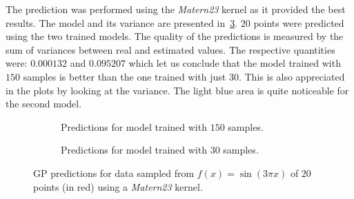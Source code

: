 The prediction was performed using the \emph{Matern23} kernel as it provided the
best results. The model and its variance are presented
in~\cref{fig_gppredftest}. $20$ points were predicted using the two trained
models. The quality of the predictions is measured by the sum of variances
between real and estimated values. The respective quantities were: $0.000132$
and $0.095207$ which let us conclude that the model trained with $150$ samples
is better than the one trained with just $30$. This is also appreciated in the
plots by looking at the variance. The light blue area is quite noticeable for
the second model.

\begin{figure}
  \begin{subfigure}[h]{.5\linewidth}
    
    \caption{Predictions for model trained with $150$ samples.}
    \label{fig_predftest}
  \end{subfigure}
  \begin{subfigure}[h]{.5\linewidth}
    
    \caption{Predictions for model trained with $30$ samples.}
    \label{fig_predftest2}
  \end{subfigure}
  \caption{GP predictions for data sampled from $f(x) = \sin(3\pi x)$ of $20$
   points (in red) using a \emph{Matern23} kernel.}
  \label{fig_gppredftest}
\end{figure}

